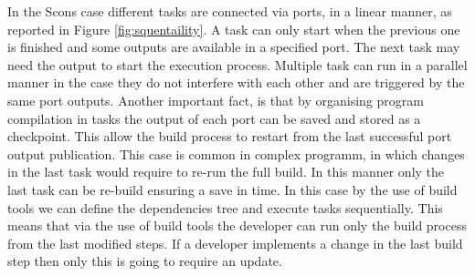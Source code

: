 \documentclass[../main.tex]{subfiles}
\begin{document}
In the Scons case different tasks are connected via ports, in a linear manner,  as reported in Figure \ref{fig:squentaility}. A task can only start when the previous one is finished and some outputs are available in a specified port. The next task may need the output to start the execution process. Multiple task can run in a parallel manner in the case they do not interfere with each other and are triggered by the same port outputs. Another important fact, is that by organising program compilation in tasks the output of each port can be saved and stored as a checkpoint. This allow the build process to restart from the last successful port output publication. This case is common in complex programm, in which changes in the last task would require to re-run the full build. In this manner only the last task can be re-build ensuring a save in time. In this case by the use of build tools we can define the dependencies tree and execute tasks sequentially. This means that via the use of build tools the developer can run only the build process from the last modified steps. If a developer implements a change in the last build step then only this is going to require an update. 
\end{document}
